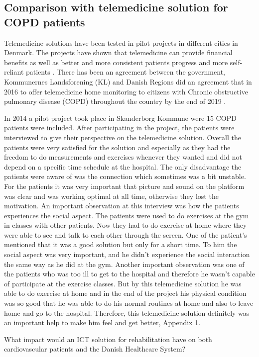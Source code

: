 \subsection{Comparison with telemedicine solution for COPD patients}
Telemedicine solutions have been tested in pilot projects in different cities in Denmark. The projects have shown that telemedicine can provide financial benefits as well as better and more consistent patients progress and more self-reliant patients \cite{KOL_1}. There has been an agreement between the government, Kommunernes Landsforening (KL) and Danish Regions did an agreement that in 2016 to offer telemedicine home monitoring to citizens with Chronic obstructive pulmonary disease (COPD) throughout the country by the end of 2019 \cite{KOL_2}. 

In 2014 a pilot project took place in Skanderborg Kommune were 15 COPD patients were included. After participating in the project, the patients were interviewed to give their perspective on the telemedicine solution. Overall the patients were very satisfied for the solution and especially as they had the freedom to do measurements and exercises whenever they wanted and did not depend on a specific time schedule at the hospital. The only disadvantage the patients were aware of was the connection which sometimes was a bit unstable. For the patients it was very important that picture and sound on the platform was clear and was working optimal at all time, otherwise they lost the motivation. An important observation at this interview was how the patients experiences the social aspect. The patients were used to do exercises at the gym in classes with other patients. Now they had to do exercise at home where they were able to see and talk to each other through the screen. One of the patient’s mentioned that it was a good solution but only for a short time. To him the social aspect was very important, and he didn’t experience the social interaction the same way as he did at the gym. Another important observation was one of the patients who was too ill to get to the hospital and therefore he wasn’t capable of participate at the exercise classes. But by this telemedicine solution he was able to do exercise at home and in the end of the project his physical condition was so good that he was able to do his normal routines at home and also to leave home and go to the hospital. Therefore, this telemedicine solution definitely was an important help to make him feel and get better, Appendix 1. 


What impact would an ICT solution for rehabilitation have on both cardiovascular patients and the Danish Healthcare System?



